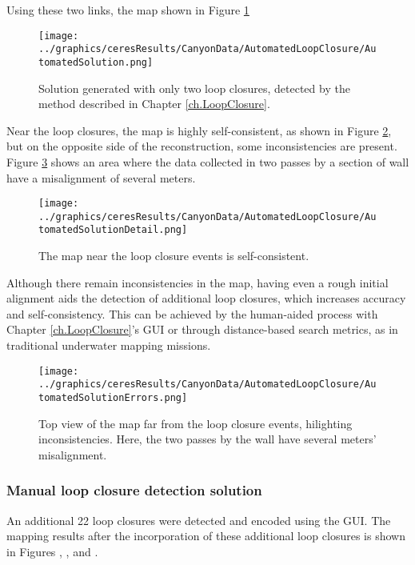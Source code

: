 Using these two links, the map shown in Figure \ref{fig:AutoSol}

 \begin{figure}[!htb]
   \centering
   \texttt{[image: ../graphics/ceresResults/CanyonData/AutomatedLoopClosure/AutomatedSolution.png]} %
   \caption{Solution generated with only two loop closures, detected by the method described in Chapter \ref{ch.LoopClosure}.}
   \label{fig:AutoSol}
\end{figure}

Near the loop closures, the map is highly self-consistent, as shown in Figure \ref{fig:AutoSol1}, but on the opposite side of the reconstruction, some inconsistencies are present. Figure \ref{fig:AutoSol2} shows an area where the data collected in two passes by a section of wall have a misalignment of several meters.

 \begin{figure}[!htb]
   \centering
   \texttt{[image: ../graphics/ceresResults/CanyonData/AutomatedLoopClosure/AutomatedSolutionDetail.png]} %
   \caption{The map near the loop closure events is self-consistent.}
   \label{fig:AutoSol1}
\end{figure}

Although there remain inconsistencies in the map, having even a rough initial alignment aids the detection of additional loop closures, which increases accuracy and self-consistency. This can be achieved by the human-aided process with Chapter \ref{ch.LoopClosure}'s GUI or through distance-based search metrics, as in traditional underwater mapping missions.

 \begin{figure}[!htb]
   \centering
   \texttt{[image: ../graphics/ceresResults/CanyonData/AutomatedLoopClosure/AutomatedSolutionErrors.png]} %
   \caption{Top view of the map far from the loop closure events, hilighting inconsistencies. Here, the two passes by the wall have several meters' misalignment.}
   \label{fig:AutoSol2}
\end{figure}


\subsubsection{Manual loop closure detection solution}

An additional 22 loop closures were detected and encoded using the GUI. The mapping results after the incorporation of these additional loop closures is shown in Figures \label{fig:RealDataSolution1}, \label{fig:RealDataSolution2}, and \label{fig:RealDataSolution3}.

